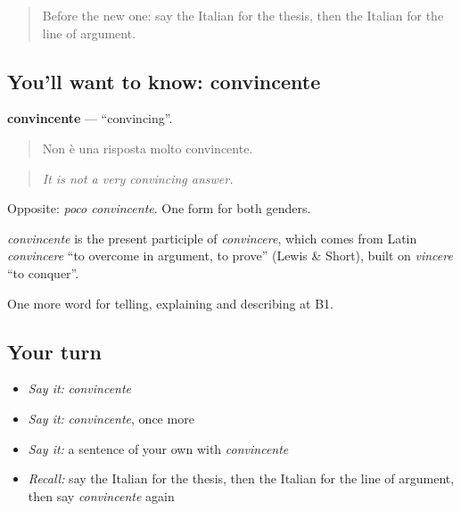 \label{lesson:IT-C340-convincente}



\begin{quote}
Before the new one: say the Italian for the thesis, then the Italian for the line of argument.
\end{quote}

\subsection*{You'll want to know: convincente}
\textbf{convincente} — \textquotedblleft{}convincing\textquotedblright{}.

\begin{quote}
Non è una risposta molto convincente.
\end{quote}

\begin{quote}
\emph{It is not a very convincing answer.}
\end{quote}

Opposite: \emph{poco convincente}. One form for both genders.

\begin{cousinweb}
\emph{convincente} is the present participle of \emph{convincere}, which comes from Latin \emph{convincere} \textquotedblleft{}to overcome in argument, to prove\textquotedblright{} (Lewis \& Short), built on \emph{vincere} \textquotedblleft{}to conquer\textquotedblright{}.
\end{cousinweb}

\begin{grammarlens}[title={What you've built}]
One more word for telling, explaining and describing at B1.
\end{grammarlens}

\subsection*{Your turn}
\begin{itemize}
\raggedright
  \item \emph{Say it:} \emph{convincente}
  \item \emph{Say it:} \emph{convincente}, once more
  \item \emph{Say it:} a sentence of your own with \emph{convincente}
  \item \emph{Recall:} say the Italian for the thesis, then the Italian for the line of argument, then say \emph{convincente} again
\end{itemize}

